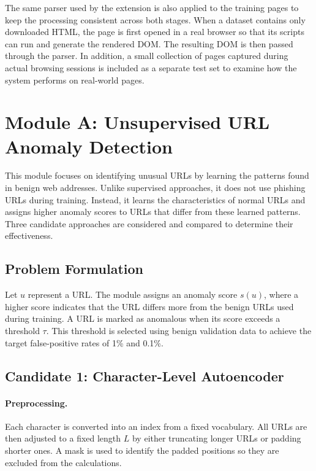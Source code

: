 \documentclass{FastFyp}
\begin{document}
The same parser used by the extension is also applied to the training pages to keep the processing consistent across both stages. When a dataset contains only downloaded HTML, the page is first opened in a real browser so that its scripts can run and generate the rendered DOM. The resulting DOM is then passed through the parser. In addition, a small collection of pages captured during actual browsing sessions is included as a separate test set to examine how the system performs on real-world pages.

\section{Module A: Unsupervised URL Anomaly Detection}
\label{sec:url-module}

This module focuses on identifying unusual URLs by learning the patterns found in benign web addresses. Unlike supervised approaches, it does not use phishing URLs during training. Instead, it learns the characteristics of normal URLs and assigns higher anomaly scores to URLs that differ from these learned patterns. Three candidate approaches are considered and compared to determine their effectiveness.

\subsection{Problem Formulation}

Let $u$ represent a URL. The module assigns an anomaly score $s(u)$, where a higher score indicates that the URL differs more from the benign URLs used during training. A URL is marked as anomalous when its score exceeds a threshold $\tau$. This threshold is selected using benign validation data to achieve the target false-positive rates of 1\% and 0.1\%.

\subsection{Candidate 1: Character-Level Autoencoder}

\paragraph{Preprocessing.} Each character is converted into an index from a fixed vocabulary. All URLs are then adjusted to a fixed length $L$ by either truncating longer URLs or padding shorter ones. A mask is used to identify the padded positions so they are excluded from the calculations.
\end{document}
